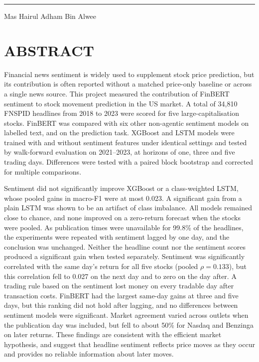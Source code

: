 \documentclass[a4paper,12pt,oneside]{report}
\newcommand{\StudentName}{Mas Hairul Adham Bin Alwee}
\newcommand{\UTPPrelimChapter}[1]{%
  \clearpage
  \phantomsection
  \addcontentsline{toc}{chapter}{#1}
  \chapter*{#1}
}
\begin{document}
\vspace{60pt}
\rule{70mm}{0.4pt}\par
\StudentName\par



\UTPPrelimChapter{ABSTRACT}
Financial news sentiment is widely used to supplement stock price prediction, but its contribution is often reported without a matched price-only baseline or across a single news source. This project measured the contribution of FinBERT sentiment to stock movement prediction in the US market. A total of 34,810 FNSPID headlines from 2018 to 2023 were scored for five large-capitalisation stocks. FinBERT was compared with six other non-agentic sentiment models on labelled text, and on the prediction task. XGBoost and LSTM models were trained with and without sentiment features under identical settings and tested by walk-forward evaluation on 2021--2023, at horizons of one, three and five trading days. Differences were tested with a paired block bootstrap and corrected for multiple comparisons.

Sentiment did not significantly improve XGBoost or a class-weighted LSTM, whose pooled gains in macro-F1 were at most 0.023. A significant gain from a plain LSTM was shown to be an artifact of class imbalance. All models remained close to chance, and none improved on a zero-return forecast when the stocks were pooled. As publication times were unavailable for 99.8\% of the headlines, the experiments were repeated with sentiment lagged by one day, and the conclusion was unchanged. Neither the headline count nor the sentiment scores produced a significant gain when tested separately. Sentiment was significantly correlated with the same day's return for all five stocks (pooled $\rho = 0.133$), but this correlation fell to 0.027 on the next day and to zero on the day after. A trading rule based on the sentiment lost money on every tradable day after transaction costs. FinBERT had the largest same-day gains at three and five days, but this ranking did not hold after lagging, and no differences between sentiment models were significant. Market agreement varied across outlets when the publication day was included, but fell to about 50\% for Nasdaq and Benzinga on later returns. These findings are consistent with the efficient market hypothesis, and suggest that headline sentiment reflects price moves as they occur and provides no reliable information about later moves.
\end{document}
